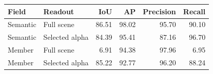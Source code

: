 \begin{tabular}{llrrrr}
\toprule
Field & Readout & IoU & AP & Precision & Recall \\
\midrule
Semantic & Full scene & 86.51 & 98.02 & 95.70 & 90.10 \\
Semantic & Selected alpha & 84.39 & 95.41 & 87.16 & 96.70 \\
Member & Full scene & 6.91 & 94.38 & 97.96 & 6.95 \\
Member & Selected alpha & 85.22 & 92.77 & 96.20 & 88.24 \\
\bottomrule
\end{tabular}
